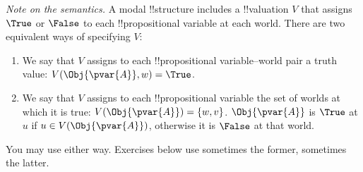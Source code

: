 \documentclass[../../../include/open-logic-section]{subfiles}
\begin{document}


\emph{Note on the semantics.} A modal !!{structure} includes a
!!{valuation} $V$ that assigns $\True$ or $\False$ to each
!!{propositional variable} at each world. There are two equivalent ways
of specifying $V$:
\begin{enumerate}
    \item We say that $V$ assigns to each !!{propositional
    variable}--world pair a truth value: $V(\Obj{\pvar{A}},w)=\True$.
    \item We say that $V$ assigns to each !!{propositional variable}
    the set of worlds at which it is true:
    $V(\Obj{\pvar{A}})=\{w,v\}$. $\Obj{\pvar{A}}$ is $\True$ at $u$ if
    $u\in V(\Obj{\pvar{A}})$, otherwise it is $\False$ at that world.
\end{enumerate}
You may use either way. Exercises below use sometimes the former, 
sometimes the latter.
\end{document}
